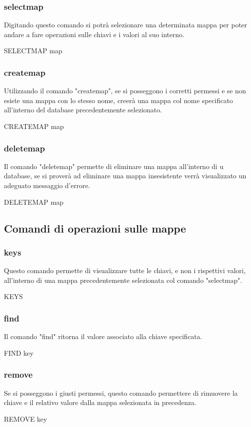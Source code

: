 \documentclass[a4paper]{article}
\begin{document}
			\subsubsection{selectmap}
			Digitando questo comando si potrà selezionare una determinata mappa per poter andare a fare operazioni sulle chiavi e i valori al suo interno. 
			\begin{center}
				SELECTMAP map
			\end{center}
			\subsubsection{createmap}
			Utilizzando il comando "createmap", se si posseggono i corretti permessi e se non esiste una mappa con lo stesso nome, creerà una mappa col nome specificato all'interno del database precedentemente selezionato.
			\begin{center}
				CREATEMAP map
			\end{center}
			\subsubsection{deletemap}
			Il comando "deletemap" permette di eliminare una mappa all'interno di u database, se si proverà ad eliminare una mappa insesistente verrà visualizzato un adeguato messaggio d'errore.
			\begin{center}
				DELETEMAP map
			\end{center}
		\subsection{Comandi di operazioni sulle mappe}
			\subsubsection{keys}
			Questo comando permette di visualizzare tutte le chiavi, e non i rispettivi valori, all'interno di una mappa precedentemente selezionata col comando "selectmap".
			\begin{center}
				KEYS
			\end{center}
			\subsubsection{find}
			Il comando "find" ritorna il valore associato alla chiave specificata.
			\begin{center}
				FIND key
			\end{center}
			\subsubsection{remove}
			Se si posseggono i giusti permessi, questo comando permettere di rimuovere la chiave e il relativo valore dalla mappa selezionata in precedenza.
			\begin{center}
				REMOVE key
			\end{center}
\end{document}
